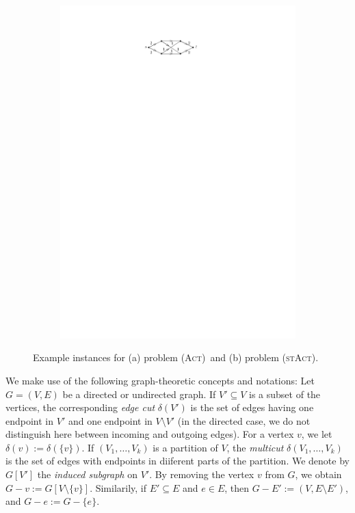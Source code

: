 \documentclass[runningheads]{llncs}
\numberwithin{equation}{section}
\newcommand{\set}[1]{\{ #1 \}}
\newcommand{\act}{\textsc{(Act)}}
\newcommand{\stact}{\textsc{(stAct)}}
\begin{document}
\begin{figure}
     \begin{subfigure}[t]{0.3\textwidth}
         \centering
         \includegraphics[scale=1]{img/example-st-act}
         \label{fig:example_st_act}
     \end{subfigure}
        \caption{Example instances for (a) problem \act\ and (b) problem \stact.}
        \label{fig:introduction_examples}
\end{figure}

We make use of the following graph-theoretic concepts and notations: Let $G = (V,E)$ be a directed or undirected graph. If $V' \subseteq V$ is a subset of the vertices, the corresponding \emph{edge cut} $\delta(V')$ is the set of edges having one endpoint in $V'$ and one endpoint in $V \setminus V'$ (in the directed case, we do not distinguish here between incoming and outgoing edges). For a vertex $v$, we let $\delta(v) := \delta(\set{v})$. If $(V_1,\dots,V_k)$ is a partition of $V$, the \emph{multicut} $\delta(V_1,\dots,V_k)$ is the set of edges with endpoints in diiferent parts of the partition. We denote by $G[V']$ the \emph{induced subgraph} on $V'$. By removing the vertex $v$ from $G$, we obtain $G - v := G[V \setminus \set{v}]$. Similarily, if $E' \subseteq E$ and $e \in E$, then $G - E' := (V, E \setminus E')$, and $G - e := G - \set{e}$.
\end{document}
